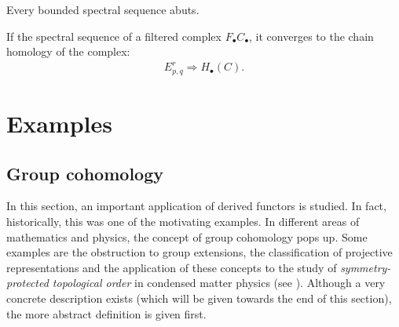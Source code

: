 
    \begin{property}
        Every bounded spectral sequence abuts.
    \end{property}

    \begin{property}
        If the spectral sequence of a filtered complex $F_\bullet C_\bullet$, it converges to the chain homology of the complex:
        \begin{gather}
            E^r_{p,q}\Rightarrow H_\bullet(C).
        \end{gather}
    \end{property}

\section{Examples}
\subsection{Group cohomology}\label{section:group_cohomology}

	In this section, an important application of derived functors is studied. In fact, historically, this was one of the motivating examples. In different areas of mathematics and physics, the concept of group cohomology pops up. Some examples are the obstruction to group extensions, the classification of projective representations and the application of these concepts to the study of \textit{symmetry-protected topological order} in condensed matter physics (see ). Although a very concrete description exists (which will be given towards the end of this section), the more abstract definition is given first.


